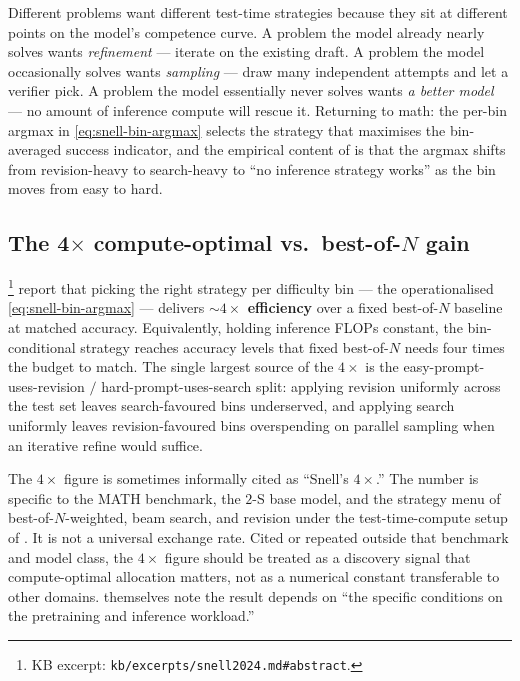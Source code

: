 \begin{intuition}
Different problems want different test-time strategies because they sit
at different points on the model's competence curve. A problem the
model already nearly solves wants \emph{refinement} --- iterate on the
existing draft. A problem the model occasionally solves wants
\emph{sampling} --- draw many independent attempts and let a verifier
pick. A problem the model essentially never solves wants \emph{a
better model} --- no amount of inference compute will rescue it.
Returning to math: the per-bin argmax in \cref{eq:snell-bin-argmax}
selects the strategy that maximises the bin-averaged success indicator,
and the empirical content of \citet[\S 3.2, Fig.~9]{snell2024} is that
the argmax shifts from revision-heavy to search-heavy to
``no inference strategy works'' as the bin moves from easy to hard.
\end{intuition}

\subsection{The 4$\times$ compute-optimal vs.\ best-of-$N$ gain}
\label{sec:snell-4x}

\citet[abstract]{snell2024}%
\footnote{KB excerpt: \texttt{kb/excerpts/snell2024.md\#abstract}.}
report that picking the right strategy per difficulty bin --- the
operationalised \cref{eq:snell-bin-argmax} --- delivers
\textbf{$\sim 4\times$ efficiency} over a fixed best-of-$N$ baseline at
matched accuracy. Equivalently, holding inference FLOPs constant, the
bin-conditional strategy reaches accuracy levels that fixed best-of-$N$
needs four times the budget to match. The single largest source of the
$4\times$ is the easy-prompt-uses-revision $/$ hard-prompt-uses-search
split: applying revision uniformly across the test set leaves
search-favoured bins underserved, and applying search uniformly leaves
revision-favoured bins overspending on parallel sampling when an
iterative refine would suffice.

\begin{forumsignal}
The $4\times$ figure is sometimes informally cited as ``Snell's
$4\times$.'' The number is specific to the MATH benchmark, the 
$2$-S\* base model, and the strategy menu of best-of-$N$-weighted, beam
search, and revision under the test-time-compute setup of
\citet[\S 5--6]{snell2024}. It is not a universal exchange rate. Cited
or repeated outside that benchmark and model class, the $4\times$
figure should be treated as a discovery signal that compute-optimal
allocation matters, not as a numerical constant transferable to other
domains. \citet[\S 6]{snell2024} themselves note the result depends on
``the specific conditions on the pretraining and inference workload.''
\end{forumsignal}

